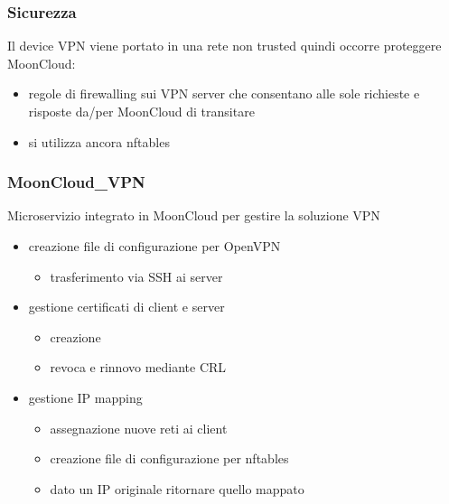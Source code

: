 \begin{frame}
    \frametitle{Sicurezza}
    Il device VPN viene portato in una rete \alert{non trusted} quindi
    occorre \alert{proteggere MoonCloud}:
    \begin{itemize}
        \item \alert{regole di firewalling} sui VPN server che consentano
        alle \alert{sole richieste e risposte} da/per MoonCloud di transitare
    \end{itemize}

    \begin{itemize}
        \item si utilizza ancora \alert{nftables}
    \end{itemize}
\end{frame}

\begin{frame}
    \frametitle{MoonCloud\_VPN}
    \alert{Microservizio} integrato in MoonCloud per gestire la soluzione VPN
    \begin{itemize}
        \item creazione file di \alert{configurazione} per \alert{OpenVPN}
        \begin{itemize}
            \item \alert{trasferimento} via SSH ai server
        \end{itemize}
        \item gestione \alert{certificati} di client e server
        \begin{itemize}
            \item creazione
            \item revoca e rinnovo mediante \alert{CRL}
        \end{itemize}
        \item gestione \alert{IP mapping}
        \begin{itemize}
            \item assegnazione nuove reti ai client
            \item creazione file di \alert{configurazione} per \alert{nftables}
            \item dato un IP originale ritornare quello mappato
        \end{itemize}
    \end{itemize}
\end{frame}

